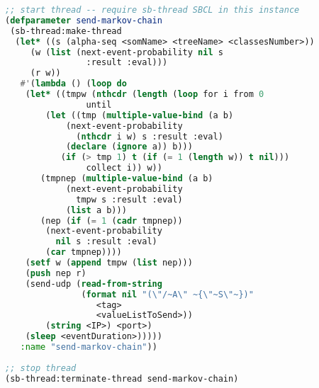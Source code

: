  \begin{lstlisting}[basicstyle=\footnotesize\ttfamily,language=Lisp]
;; start thread -- require sb-thread SBCL in this instance
(defparameter send-markov-chain
 (sb-thread:make-thread
  (let* ((s (alpha-seq <somName> <treeName> <classesNumber>))
	 (w (list (next-event-probability nil s 
	            :result :eval)))
	 (r w))
   #'(lambda () (loop do
    (let* ((tmpw (nthcdr (length (loop for i from 0
				until
		(let ((tmp (multiple-value-bind (a b)
			(next-event-probability 
			  (nthcdr i w) s :result :eval) 
			(declare (ignore a)) b)))
		   (if (> tmp 1) t (if (= 1 (length w)) t nil)))
				collect i)) w))
       (tmpnep (multiple-value-bind (a b)
	        (next-event-probability 
	          tmpw s :result :eval) 
	        (list a b)))
       (nep (if (= 1 (cadr tmpnep))
		(next-event-probability
		  nil s :result :eval)
		(car tmpnep))))
	(setf w (append tmpw (list nep)))
	(push nep r)
	(send-udp (read-from-string 
               (format nil "(\"/~A\" ~{\"~S\"~})"
                  <tag>
                  <valueListToSend>)) 
	    (string <IP>) <port>)
	(sleep <eventDuration>)))))
   :name "send-markov-chain"))
   
;; stop thread
(sb-thread:terminate-thread send-markov-chain)
\end{lstlisting}